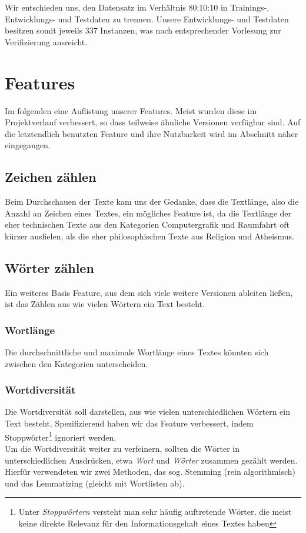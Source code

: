 \documentclass[
	11pt,
	a4paper
]{scrartcl}
\begin{document}
Wir entschieden uns, den Datensatz im Verhältnis 80:10:10 in Trainings-, Entwicklungs- und Testdaten zu trennen. Unsere Entwicklungs- und Testdaten besitzen
somit jeweils 337 Instanzen, was nach entsprechender Vorlesung zur Verifizierung ausreicht.

\section{Features}
Im folgenden eine Auflistung unserer Features. Meist wurden diese im Projektverlauf verbessert, so dass teilweise ähnliche
Versionen verfügbar sind. Auf die letztendlich benutzten Feature und ihre Nutzbarkeit wird im Abschnitt \emph{}
näher eingegangen.

\subsection{Zeichen zählen}\label{zeichenzaehlen}
Beim Durchschauen der Texte kam uns der Gedanke, dass die Textlänge, also die Anzahl an Zeichen eines Textes, ein mögliches Feature
ist, da die Textlänge der eher technischen Texte aus den Kategorien Computergrafik und Raumfahrt oft kürzer ausfielen, als die eher
philosophischen Texte aus Religion und Atheismus.

\subsection{Wörter zählen}\label{woerterZaehlen}
Ein weiteres Basis Feature, aus dem sich viele weitere Versionen ableiten ließen, ist das Zählen aus wie vielen
Wörtern ein Text besteht.

\subsubsection{Wortlänge}
Die durchschnittliche und maximale Wortlänge eines Textes könnten sich zwischen den Kategorien unterscheiden.

\subsubsection{Wortdiversität}\label{wortdiversitaet}
Die Wortdiversität soll darstellen, aus wie vielen unterschiedlichen Wörtern ein Text besteht. Spezifizierend haben wir das Feature verbessert,
indem Stoppwörter\footnote{Unter \emph{Stoppwörtern} versteht man sehr häufig auftretende Wörter, die meist keine direkte Relevanz für den Informationsgehalt
eines Textes haben} ignoriert werden. \\
Um die Wortdiversität weiter zu verfeinern, sollten die Wörter in unterschiedlichen Ausdrücken, etwa \emph{Wort} und \emph{Wörter} zusammen gezählt werden.
Hierfür verwendeten wir zwei Methoden, das sog. Stemming (rein algorithmisch) und das Lemmatizing (gleicht mit Wortlisten ab).
\end{document}
